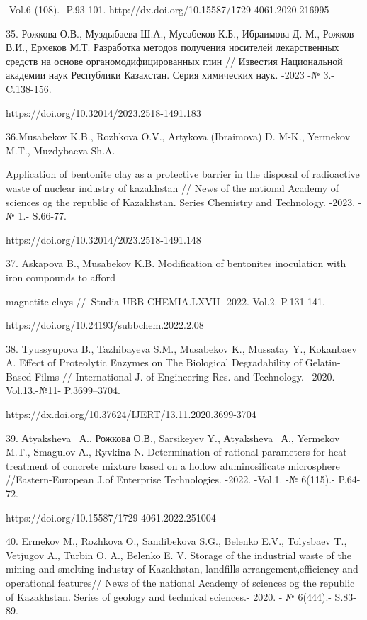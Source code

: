 \begin{noparindent}
-Vol.6 (108).- P.93-101.
http://dx.doi.org/10.15587/1729-4061.2020.216995

35. Рожкова О.В., Муздыбаева Ш.А., Мусабеков К.Б., Ибраимова Д. М.,
Рожков В.И., Ермеков М.Т. Разработка методов получения носителей
лекарственных средств на основе органомодифицированных глин // Известия
Национальной академии наук Республики Казахстан. Серия химических наук.
-2023 -№ 3.- C.138-156.

https://doi.org/10.32014/2023.2518-1491.183

36.Musabekov K.B., Rozhkova O.V., Artykova (Ibraimova) D. M-K., Yermekov
M.T., Muzdybaeva Sh.A.

Application of bentonite clay as a protective
barrier in the disposal of radioactive waste of nuclear industry of
kazakhstan // News of the national Academy of sciences og the republic
of Kazakhstan. Series Chemistry and Technology. -2023. -№ 1.- S.66-77.

https://doi.org/10.32014/2023.2518-1491.148

37. Askapova B., Musabekov K.B. Modification of bentonites inoculation
with iron compounds to afford

magnetite clays //~Studia UBB CHEMIA.LXVII
-2022.-Vol.2.-P.131-141.

https://doi.org/10.24193/subbchem.2022.2.08

38. Tyussyupova B., Tazhibayeva S.M., Musabekov K., Mussatay Y.,
Kokanbaev A. Effect of Proteolytic Enzymes on The Biological
Degradability of Gelatin-Based Films // International J. of Engineering
Res. and Technology.~-2020.-Vol.13.-№11- P.3699--3704.

https://dx.doi.org/10.37624/IJERT/13.11.2020.3699-3704

39. Аtyaksheva~ А., Рожкова О.В., Sarsikeyev Y., Аtyaksheva~ А.,
Yermekov M.T., Smagulov А., Ryvkina N. Determination of rational
parameters for heat treatment of concrete mixture based on a hollow
aluminosilicate microsphere //Eastern-European J.of Enterprise
Technologies. -2022. -Vol.1. -№ 6(115).- P.64-72.

https://doi.org/10.15587/1729-4061.2022.251004

40. Ermekov M., Rozhkova O., Sandibekova S.G., Belenko E.V., Tolysbaev
T., Vetjugov A., Turbin O. A., Belenko E. V. Storage of the industrial
waste of the mining and smelting industry of Kazakhstan, landfills
arrangement,efficiency and operational features// News of the national
Academy of sciences og the republic of Kazakhstan. Series of geology and
technical sciences.- 2020. - № 6(444).- S.83-89.


\end{noparindent}
